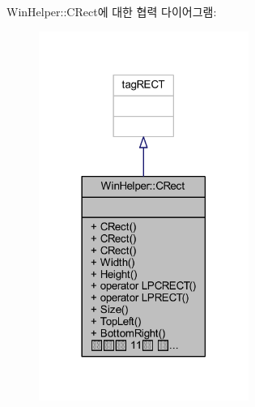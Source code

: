 Win\+Helper\+:\+:C\+Rect에 대한 협력 다이어그램\+:\nopagebreak
\begin{figure}[H]
\begin{center}
\leavevmode
\includegraphics[width=194pt]{class_win_helper_1_1_c_rect__coll__graph}
\end{center}
\end{figure}
